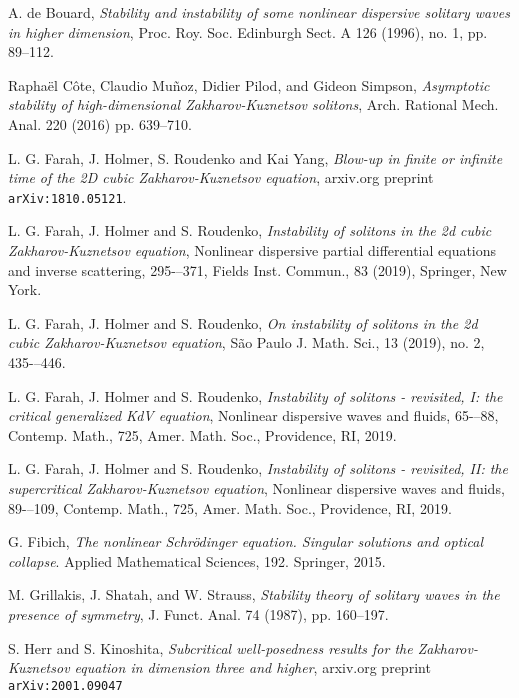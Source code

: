 \documentclass[12pt,letterpaper]{amsart}
\theoremstyle{remark}
\numberwithin{equation}{section}
\numberwithin{theorem}{section}
\numberwithin{table}{section}
\begin{document}
\begin{thebibliography}{99}

 A. de Bouard, 
\emph{Stability and instability of some nonlinear dispersive solitary waves in higher dimension}, Proc. Roy. Soc. Edinburgh Sect. A 126 (1996), no. 1, pp. 89--112.

Rapha\"el C\^ote, Claudio Mu\~noz, Didier Pilod, and Gideon Simpson, 
\emph{Asymptotic stability of high-dimensional Zakharov-Kuznetsov solitons},  
Arch. Rational Mech. Anal. 220 (2016) pp. 639--710.

L. G. Farah, J. Holmer, S. Roudenko and Kai Yang, 
\emph{Blow-up in finite or infinite time of the 2D cubic Zakharov-Kuznetsov equation}, arxiv.org preprint \texttt{arXiv:1810.05121}.

 L. G. Farah, J. Holmer and S. Roudenko, 
\emph{Instability of solitons in the 2d cubic Zakharov-Kuznetsov equation}, 
Nonlinear dispersive partial differential equations and inverse scattering, 295-–371, 
Fields Inst. Commun., 83 (2019), Springer, New York.

 L. G. Farah, J. Holmer and S. Roudenko, 
\emph{On instability of solitons in the 2d cubic Zakharov-Kuznetsov equation}, 
S\~ao Paulo J. Math. Sci., 13 (2019), no. 2, 435-–446.

 L. G. Farah, J. Holmer and S. Roudenko, 
\emph{Instability of solitons - revisited, I: the critical generalized KdV equation}, Nonlinear dispersive waves and fluids, 65-–88, 
Contemp. Math., 725, Amer. Math. Soc., Providence, RI, 2019.

 L. G. Farah, J. Holmer and S. Roudenko, 
\emph{Instability of solitons - revisited, II: the supercritical Zakharov-Kuznetsov equation},  
Nonlinear dispersive waves and fluids, 89-–109, 
Contemp. Math., 725, Amer. Math. Soc., Providence, RI, 2019.

G. Fibich, 
\emph{The nonlinear Schr\"odinger equation. Singular solutions and optical collapse}. 
Applied Mathematical Sciences, 192. Springer, 2015.

M. Grillakis, J. Shatah, and W. Strauss, 
\emph{Stability theory of solitary waves in the presence of symmetry}, 
J. Funct. Anal. 74 (1987), pp. 160--197.

S. Herr and S. Kinoshita, 
\emph{Subcritical well-posedness results for the Zakharov-Kuznetsov equation in dimension three and higher}, arxiv.org preprint \texttt{arXiv:2001.09047}


\end{thebibliography}
\end{document}

